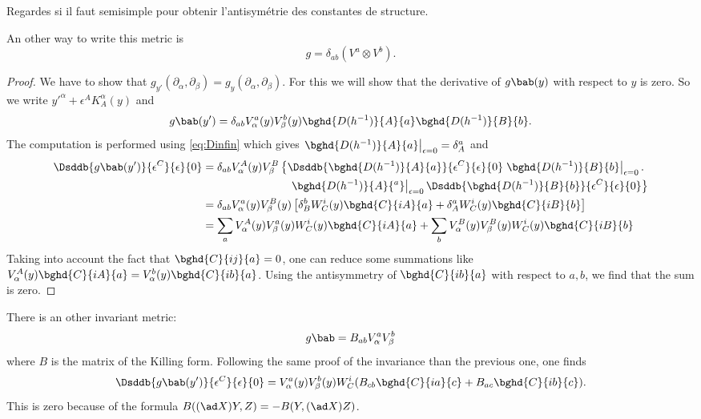 \begin{probleme}
Regardes si il faut semisimple pour obtenir l'antisymétrie des constantes de structure.
\end{probleme}

An other way to write this metric is 
\[
  g=\delta_{ab}(V^a\otimes V^b).
\]

\begin{proof}
We have to show that $g_{y'}(\partial_{\alpha},\partial_{\beta})=g_y(\partial_{\alpha},\partial_{\beta})$. For this we will show that the derivative of $g\bab(y)$ with respect to $y$ is zero. So we write ${y'}^{\alpha}+\epsilon^AK_A^{\alpha}(y)$ and 
\[
   g\bab(y')=\delta_{ab}V^a_{\alpha}(y)V^b_{\beta}(y)\bghd{D(h^{-1})}{A}{a}\bghd{D(h^{-1})}{B}{b}.
\]
The computation is performed using \eqref{eq:Dinfin} which gives $\left.\bghd{ D(h^{-1}) }{A}{a}\right|_{\epsilon=0}=\delta^a_A$ and 
\begin{equation}
\begin{split}
  \Dsddb{  g\bab(y')  }{\epsilon^C}{\epsilon}{0}&=\delta_{ab}V_{\alpha}^A(y)V_{\beta}^B
                                       \left\{  
     \Dsddb{  \bghd{D(h^{-1})}{A}{a}  }{\epsilon^C}{\epsilon}{0}\left.\bghd{D(h^{-1})}{B}{b}\right|_{\epsilon=0}.
                                       \right.\\
 &\phantom{ =\delta_{ab}V_{\alpha}^A(y)V_{\beta}^B  }\quad  \left. \left.\bghd{D(h^{-1})}{A}{^a}\right|_{\epsilon=0}\Dsddb{ \bghd{D(h^{-1})}{B}{b} }{\epsilon^C}{\epsilon}{0}\right\}\\
&=\delta_{ab}V^a_{\alpha}(y)V_{\beta}^B(y)\left[  \delta_B^bW^i_C(y)\bghd{C}{iA}{a}+\delta_A^a W^i_C(y)\bghd{C}{iB}{b}  \right]\\
&=\sum_a V^A_{\alpha}(y)V_{\beta}^a(y)W^i_C(y)\bghd{C}{iA}{a}+\sum_b V^B_{\alpha}(y)V_{\beta}^B(y)W^i_C(y)\bghd{C}{iB}{b}
\end{split}
\end{equation}
Taking into account the fact that $\bghd{C}{ij}{a}=0$, one can reduce some summations like $V_{\alpha}^A(y)\bghd{C}{iA}{a}=V_{\alpha}^b(y)\bghd{C}{ib}{a}$. Using the antisymmetry of $\bghd{C}{ib}{a}$ with respect to $a,b$, we find that the sum is zero.

\end{proof}

There is an other invariant metric:
\begin{equation}
   g\bab=B_{ab}V_{\alpha}^aV_{\beta}^b
\end{equation}
where $B$ is the matrix of the Killing form. Following the same proof of the invariance than the previous one, one finds
\[
  \Dsddb{ g\bab(y') }{\epsilon^C}{\epsilon}{0}=V^a_{\alpha}(y)V^b_{\beta}(y)W_C^i( B_{cb}\bghd{C}{ia}{c}+
                               B_{ac}\bghd{C}{ib}{c} ).
\]
This is zero because of the formula $B((\ad X) Y,Z)=-B(Y,(\ad X) Z)$. 

